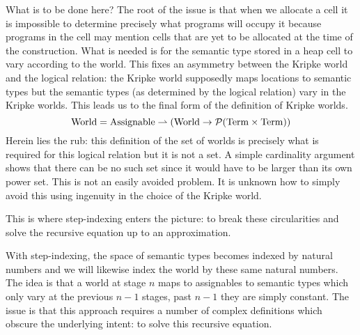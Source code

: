 What is to be done here? The root of the issue is that when we
allocate a cell it is impossible to determine precisely what programs
will occupy it because programs in the cell may mention cells that are
yet to be allocated at the time of the construction. What is needed is
for the semantic type stored in a heap cell to vary according to the
world. This fixes an asymmetry between the Kripke world and the
logical relation: the Kripke world supposedly maps locations to
semantic types but the semantic types (as determined by the logical
relation) vary in the Kripke worlds. This leads us to the final form
of the definition of Kripke worlds.
\[
  \mathrm{World} = \mathrm{Assignable} \rightharpoonup (\mathrm{World} \to \mathcal{P}(\mathrm{Term} \times \mathrm{Term}))
\]
Herein lies the rub: this definition of the set of worlds is precisely
what is required for this logical relation but it is not a set. A
simple cardinality argument shows that there can be no such set since
it would have to be larger than its own power set. This is not an
easily avoided problem. It is unknown how to simply avoid this using
ingenuity in the choice of the Kripke world.

This is where step-indexing enters the picture: to break these
circularities and solve the recursive equation up to an approximation.

With step-indexing, the space of semantic types becomes indexed by
natural numbers and we will likewise index the world by these same
natural numbers. The idea is that a world at stage $n$ maps to
assignables to semantic types which only vary at the previous $n - 1$
stages, past $n - 1$ they are simply constant. The issue is that this
approach requires a number of complex definitions which obscure the
underlying intent: to solve this recursive equation.

